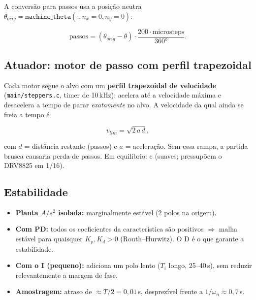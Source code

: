 \documentclass[11pt,a4paper,oneside]{article}
\begin{document}
A conversão para passos usa a posição neutra $\theta_{orig}=\texttt{machine\_theta}(\cdot,n_x{=}0,n_y{=}0)$:

\begin{equation}
  \text{passos} = (\theta_{orig} - \theta)\cdot\frac{200\cdot\text{microsteps}}{360°}.
\end{equation}

\subsection{Atuador: motor de passo com perfil trapezoidal}

Cada motor segue o alvo com um \textbf{perfil trapezoidal de velocidade}
(\texttt{main/steppers.c}, timer de 10\,kHz): acelera até a velocidade máxima e
desacelera a tempo de parar \emph{exatamente} no alvo. A velocidade da qual ainda
se freia a tempo é

\begin{equation}
  v_{lim} = \sqrt{2\,a\,d},
\end{equation}

com $d$ = distância restante (passos) e $a$ = aceleração. Sem essa rampa, a
partida brusca causaria perda de passos. Em equilíbrio:
 e 
(suaves; pressupõem o DRV8825 em 1/16).

\subsection{Estabilidade}

\begin{itemize}
  \item \textbf{Planta $A/s^2$ isolada:} marginalmente estável (2 polos na origem).
  \item \textbf{Com PD:} todos os coeficientes da característica são positivos
  $\Rightarrow$ malha estável para quaisquer $K_p,K_d>0$ (Routh–Hurwitz). O D é
  o que garante a estabilidade.
  \item \textbf{Com o I (pequeno):} adiciona um polo lento ($T_i$ longo, 25–40\,s),
  sem reduzir relevantemente a margem de fase.
  \item \textbf{Amostragem:} atraso de $\approx T/2 = 0{,}01$\,s, desprezível
  frente a $1/\omega_n\approx 0{,}7$\,s.
\end{itemize}

\end{document}
